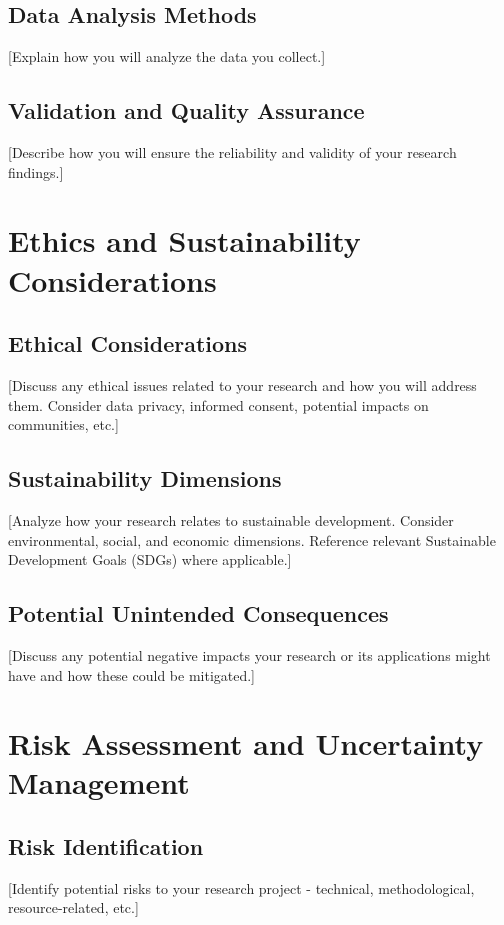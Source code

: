 \documentclass[12pt,a4paper]{article}
\begin{document}
\subsection{Data Analysis Methods}
[Explain how you will analyze the data you collect.]

\subsection{Validation and Quality Assurance}
[Describe how you will ensure the reliability and validity of your research findings.]

\section{Ethics and Sustainability Considerations}
\label{sec:ethics}

\subsection{Ethical Considerations}
[Discuss any ethical issues related to your research and how you will address them. Consider data privacy, informed consent, potential impacts on communities, etc.]

\subsection{Sustainability Dimensions}
[Analyze how your research relates to sustainable development. Consider environmental, social, and economic dimensions. Reference relevant Sustainable Development Goals (SDGs) where applicable.]

\subsection{Potential Unintended Consequences}
[Discuss any potential negative impacts your research or its applications might have and how these could be mitigated.]

\section{Risk Assessment and Uncertainty Management}
\label{sec:risk}

\subsection{Risk Identification}
[Identify potential risks to your research project - technical, methodological, resource-related, etc.]
\end{document}
